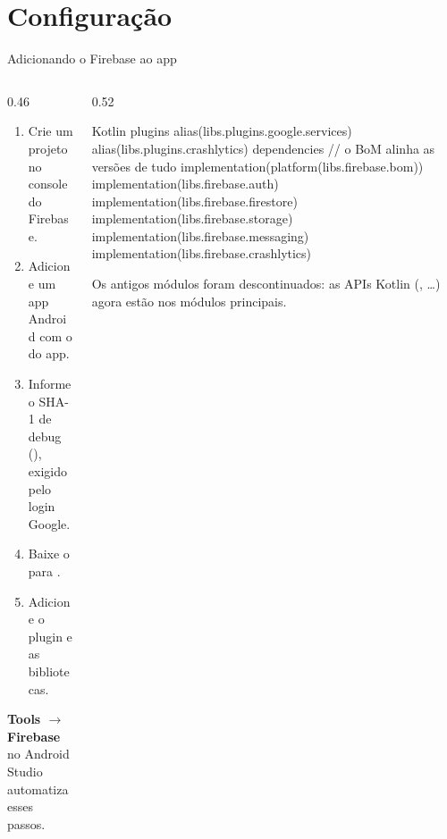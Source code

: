 \documentclass[aspectratio=169,10pt]{beamer}
\begin{document}
\section{Configuração}

\begin{frame}[fragile]{Adicionando o Firebase ao app}
  \begin{columns}[T]
    \begin{column}{0.46\textwidth}
      \begin{enumerate}
        \item Crie um projeto no console do Firebase.
        \item Adicione um app Android com o  do app.
        \item Informe o SHA-1 de debug (), exigido pelo login Google.
        \item Baixe o  para .
        \item Adicione o plugin e as bibliotecas.
      \end{enumerate}
      \begin{dica}
        \textbf{Tools $\rightarrow$ Firebase} no Android Studio automatiza esses passos.
      \end{dica}
    \end{column}
    \begin{column}{0.52\textwidth}
\begin{codigo}[title=app/build.gradle.kts]{Kotlin}
plugins {
  alias(libs.plugins.google.services)
  alias(libs.plugins.crashlytics)
}
dependencies {
  // o BoM alinha as versões de tudo
  implementation(platform(libs.firebase.bom))
  implementation(libs.firebase.auth)
  implementation(libs.firebase.firestore)
  implementation(libs.firebase.storage)
  implementation(libs.firebase.messaging)
  implementation(libs.firebase.crashlytics)
}
\end{codigo}
      \begin{atencao}
        Os antigos módulos  foram descontinuados: as APIs Kotlin (, \ldots) agora estão nos módulos principais.
      \end{atencao}
    \end{column}
  \end{columns}
\end{frame}

\end{document}
